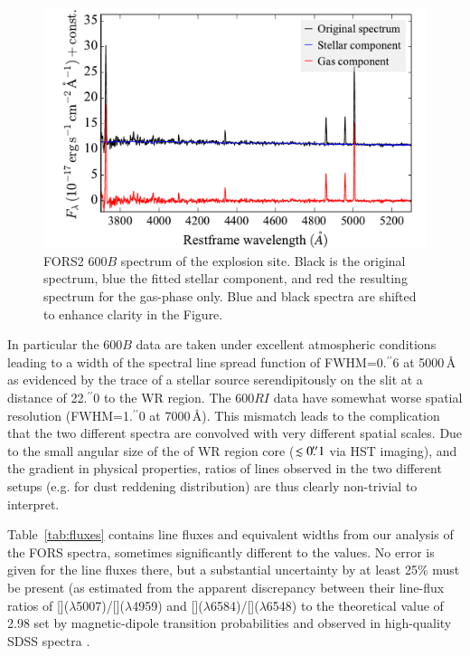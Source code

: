 \documentclass[traditabstract]{aa}
\newcommand{\farc}{\hbox{$.\!\!^{\prime\prime}$}}
\newcommand{\oiii}{[\ion{O}{iii}]}
\newcommand{\nii}{[\ion{N}{ii}]}
\begin{document}
\begin{appendix}
\begin{figure}
\includegraphics[angle=0, width=0.9\columnwidth]{Figs/FORS2_3700_5300_starlight.pdf}
\caption{FORS2 600$B$ spectrum of the explosion site. Black is the original spectrum, blue the fitted stellar component, and red the resulting spectrum for the gas-phase only. Blue and black spectra are shifted to enhance clarity in the Figure.}
\label{fig:FORSSN}
\end{figure}

In particular the 600$B$ data are taken under excellent atmospheric conditions leading to a width of the spectral line spread function of FWHM=0\farc{6} at 5000\,\AA\, as evidenced by the trace of a stellar source serendipitously on the slit at a distance of 22\farc{0} to the WR region. The 600$RI$ data have somewhat worse spatial resolution (FWHM=1\farc{0} at 7000\,\AA). This mismatch leads to the complication that the two different spectra are convolved with very different spatial scales. Due to the small angular size of the of WR region core ($\lesssim 0\farc{1}$ via HST imaging), and the gradient in physical properties, ratios of lines observed in the two different setups (e.g. for dust reddening distribution) are thus clearly non-trivial to interpret.

Table~\ref{tab:fluxes} contains line fluxes and equivalent widths from our analysis of the FORS spectra, sometimes significantly different to the \citet{2006A&A...454..103H} values. No error is given for the line fluxes there, but a substantial uncertainty by at least 25\% must be present (as estimated from the apparent discrepancy between their line-flux ratios of \oiii($\lambda$5007)/\oiii($\lambda$4959) and \nii($\lambda$6584)/\nii($\lambda$6548) to the theoretical value of 2.98 set by magnetic-dipole transition probabilities and observed in high-quality SDSS spectra \citep[e.g.][]{2000MNRAS.312..813S, 2006agna.book.....O, 2016MNRAS.459.3475W}.


\end{appendix}
\end{document}
